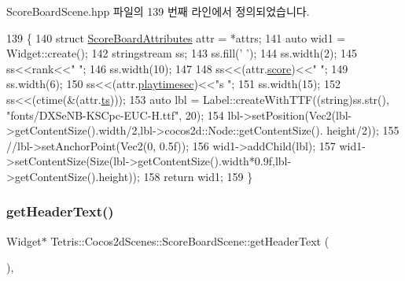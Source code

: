 Score\+Board\+Scene.\+hpp 파일의 139 번째 라인에서 정의되었습니다.


\begin{DoxyCode}
139                                                                                \{
140                 \textcolor{keyword}{struct }\hyperlink{struct_tetris_1_1_d_b_management_1_1_score_board_attributes}{ScoreBoardAttributes} attr = *attrs;
141                 \textcolor{keyword}{auto} wid1 = Widget::create();
142                 stringstream ss;
143                 ss.fill(\textcolor{charliteral}{' '});
144                 ss.width(2);
145                 ss<<rank<<\textcolor{stringliteral}{"  "};
146                 ss.width(10);
147                 
148                 ss<<(attr.\hyperlink{struct_tetris_1_1_d_b_management_1_1_score_board_attributes_acca4d00875cd210845e3ed2532ed276a}{score})<<\textcolor{stringliteral}{"  "};
149                 ss.width(6);
150                 ss<<(attr.\hyperlink{struct_tetris_1_1_d_b_management_1_1_score_board_attributes_a1534fca0e7a2795c055de645cba2ea18}{playtimesec})<<\textcolor{stringliteral}{"s  "};
151                 ss.width(15);
152                 ss<<(ctime(&(attr.\hyperlink{struct_tetris_1_1_d_b_management_1_1_score_board_attributes_a79b3c0fb31de1f4fd878b90695480b75}{ts})));
153                 \textcolor{keyword}{auto} lbl = Label::createWithTTF((\textcolor{keywordtype}{string})ss.str(), \textcolor{stringliteral}{"fonts/DXSeNB-KSCpc-EUC-H.ttf"}, 20);
154                 lbl->setPosition(Vec2(lbl->getContentSize().width/2,lbl->cocos2d::Node::getContentSize().
      height/2));
155                 \textcolor{comment}{//lbl->setAnchorPoint(Vec2(0, 0.5f));}
156                 wid1->addChild(lbl);
157                 wid1->setContentSize(Size(lbl->getContentSize().width*0.9f,lbl->getContentSize().height));
158                 \textcolor{keywordflow}{return} wid1;
159             \}
\end{DoxyCode}
\mbox{\label{class_tetris_1_1_cocos2d_scenes_1_1_score_board_scene_a89a944c51155ffa16474e406a1103753}} 
\subsubsection{\texorpdfstring{get\+Header\+Text()}{getHeaderText()}}
{\footnotesize\ttfamily Widget$\ast$ Tetris\+::\+Cocos2d\+Scenes\+::\+Score\+Board\+Scene\+::get\+Header\+Text (\begin{DoxyParamCaption}{ }\end{DoxyParamCaption})\hspace{0.3cm}{\ttfamily [inline]}, {\ttfamily [protected]}}

